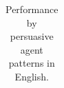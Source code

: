 \begin{table}[ht]
\begin{tabular}{lcccc|ccccc|ccccc}
        \bottomrule
    \end{tabular}
    \caption{Performance by persuasive agent patterns in English.}
    \label{tab:model_comparison_split_init_category_en}
\end{table}

\setlength{\tabcolsep}{6pt} %